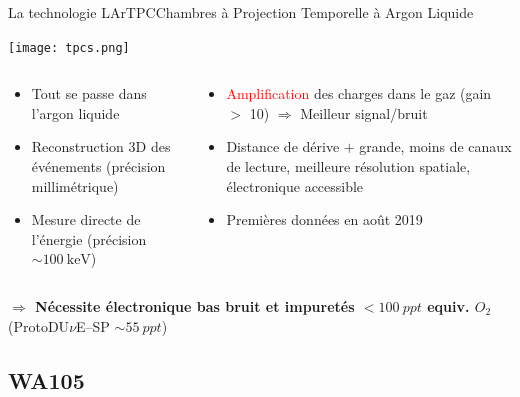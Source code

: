     \begin{frame}{La technologie LArTPC}{Chambres à Projection Temporelle à Argon Liquide}
       	\begin{scriptsize}
       			\centering\texttt{[image: tpcs.png]}\\
       			\begin{columns}
       				\begin{column}{0.5\textwidth}
       					\begin{itemize}
           					\item Tout se passe dans l'argon liquide
       						\item Reconstruction 3D des événements (précision millimétrique)
       						\item Mesure directe de l'énergie (précision $\sim\SI{100}{\kilo\electronvolt}$)
       					\end{itemize}
       				\end{column}
       				\begin{column}{0.5\textwidth}
       					\begin{itemize}
       						\item \textcolor{red}{Amplification} des charges dans le gaz (gain $>$ 10) $\Rightarrow$ Meilleur signal/bruit
       						\item Distance de dérive $+$ grande, moins de canaux de lecture, meilleure résolution spatiale, électronique accessible
       						\item Premières données en août 2019
       					\end{itemize}
       				\end{column}
       			\end{columns}
       			\vfill
       			\textbf{$\Rightarrow$ Nécessite électronique bas bruit et impuretés $<\SI{100}{ppt}$ equiv. $O_2$} (ProtoDU$\nu$E--SP $\sim\SI{55}{ppt}$)
       	\end{scriptsize}
    \end{frame}
    
    \subsection{WA105}

